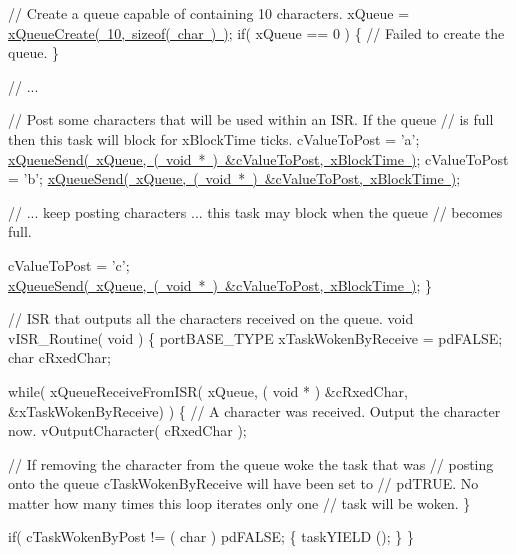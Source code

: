 \begin{DoxyPre}   // Create a queue capable of containing 10 characters.
   xQueue = \mbox{\hyperlink{queue_8h_aeb858b824bd74a934ea7ebb81af2a6bb}{xQueueCreate( 10, sizeof( char ) )}};
   if( xQueue == 0 )
   \{
    // Failed to create the queue.
   \}\end{DoxyPre}



\begin{DoxyPre}   // ...\end{DoxyPre}



\begin{DoxyPre}   // Post some characters that will be used within an ISR.  If the queue
   // is full then this task will block for xBlockTime ticks.
   cValueToPost = 'a';
   \mbox{\hyperlink{queue_8h_af7eb49d3249351176992950d9185abe9}{xQueueSend( xQueue, ( void * ) &cValueToPost, xBlockTime )}};
   cValueToPost = 'b';
   \mbox{\hyperlink{queue_8h_af7eb49d3249351176992950d9185abe9}{xQueueSend( xQueue, ( void * ) &cValueToPost, xBlockTime )}};\end{DoxyPre}



\begin{DoxyPre}   // ... keep posting characters ... this task may block when the queue
   // becomes full.\end{DoxyPre}



\begin{DoxyPre}   cValueToPost = 'c';
   \mbox{\hyperlink{queue_8h_af7eb49d3249351176992950d9185abe9}{xQueueSend( xQueue, ( void * ) &cValueToPost, xBlockTime )}};
\}\end{DoxyPre}



\begin{DoxyPre}// ISR that outputs all the characters received on the queue.
void vISR\_Routine( void )
\{
portBASE\_TYPE xTaskWokenByReceive = pdFALSE;
char cRxedChar;\end{DoxyPre}



\begin{DoxyPre}   while( xQueueReceiveFromISR( xQueue, ( void * ) &cRxedChar, &xTaskWokenByReceive) )
   \{
    // A character was received.  Output the character now.
    vOutputCharacter( cRxedChar );\end{DoxyPre}



\begin{DoxyPre}    // If removing the character from the queue woke the task that was
    // posting onto the queue cTaskWokenByReceive will have been set to
    // pdTRUE.  No matter how many times this loop iterates only one
    // task will be woken.
   \}\end{DoxyPre}



\begin{DoxyPre}   if( cTaskWokenByPost != ( char ) pdFALSE;
   \{
    taskYIELD ();
   \}
\}
\end{DoxyPre}
 